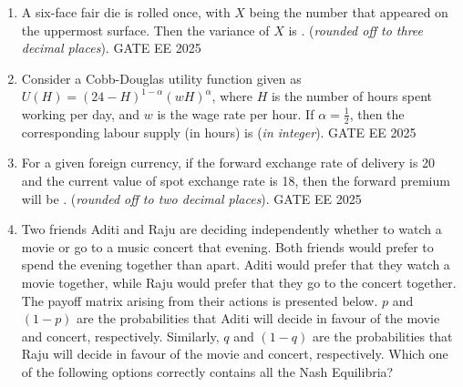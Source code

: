 \documentclass[journal,12pt,onecolumn]{IEEEtran}
\theoremstyle{remark}
\begin{document}
\begin{enumerate}
\item A six-face fair die is rolled once, with $X$ being the number that appeared on the uppermost surface. Then the variance of $X$ is \underline{\hspace{2cm}}. (\textit{rounded off to three decimal places}).
GATE EE 2025\\
\item Consider a Cobb-Douglas utility function given as $U(H) = (24-H)^{1-\alpha}(wH)^\alpha$, where $H$ is the number of hours spent working per day, and $w$ is the wage rate per hour. If $\alpha = \frac{1}{2}$, then the corresponding labour supply (in hours) is \underline{\hspace{2cm}} (\textit{in integer}).
GATE EE 2025\\
\item For a given foreign currency, if the forward exchange rate of delivery is 20 and the current value of spot exchange rate is 18, then the forward premium will be \underline{\hspace{2cm}}. (\textit{rounded off to two decimal places}).
GATE EE 2025\\
\item Two friends Aditi and Raju are deciding independently whether to watch a movie or go to a music concert that evening. Both friends would prefer to spend the evening together than apart. Aditi would prefer that they watch a movie together, while Raju would prefer that they go to the concert together. The payoff matrix arising from their actions is presented below. $p$ and $(1-p)$ are the probabilities that Aditi will decide in favour of the movie and concert, respectively. Similarly, $q$ and $(1-q)$ are the probabilities that Raju will decide in favour of the movie and concert, respectively. Which one of the following options correctly contains all the Nash Equilibria?


\end{enumerate}
\end{document}
